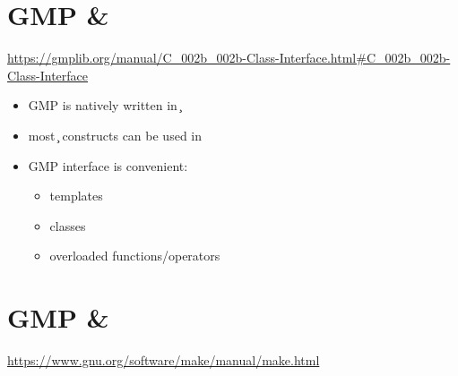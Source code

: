 \section{GMP \& \cpp}

\codes{}

\url{https://gmplib.org/manual/C_002b_002b-Class-Interface.html#C_002b_002b-Class-Interface}

\begin{itemize}
\item GMP is natively written in \c
\item most \c{} constructs can be used in \cpp
\item GMP \cpp{} interface is convenient:
  \begin{itemize}
  \item templates
  \item classes
  \item overloaded functions/operators
  \end{itemize}
\end{itemize}

\item \cite{gmp}


\section{GMP \& \make}

\url{https://www.gnu.org/software/make/manual/make.html}

\item \cite{make}
